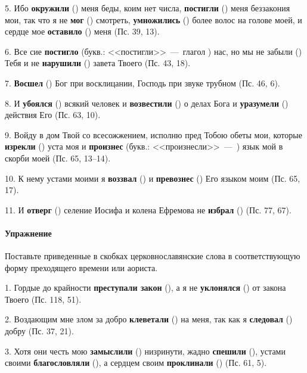 \documentclass[11pt,a4paper,oneside]{memoir}
\begin{document}
    5. Ибо \textbf{окружили} ({}) меня беды, коим нет числа, \textbf{постигли} ({}) меня беззакония мои, так что я не \textbf{мог} ({}) смотреть, \textbf{умножились} ({}) более волос на голове моей, и сердце мое \textbf{оставило} ({}) меня (Пс. 39, 13).
    
    6. Все сие \textbf{постигло} (букв.: <<постигли>>~---~глагол {}) нас, но мы не забыли ({}) Тебя и не \textbf{нарушили} ({}) завета Твоего (Пс. 43, 18).
    
    7. \textbf{Восшел} ({}) Бог при восклицании, Господь при звуке трубном (Пс. 46, 6).
    
    8. И \textbf{убоялся} ({}) всякий человек и \textbf{возвестили} ({}) о делах Бога и \textbf{уразумели} ({}) действия Его (Пс. 63, 10).
    
    9. Войду в дом Твой со всесожжением, исполню пред Тобою обеты мои, которые \textbf{изрекли} ({}) уста моя и \textbf{произнес} (букв.: <<произнесли>>~---~{}) язык мой в скорби моей (Пс. 65, 13--14).
    
    10. К нему устами моими я \textbf{воззвал} ({}) и \textbf{превознес} ({}) Его языком моим (Пс. 65, 17).
    
    11. И \textbf{отверг} ({}) селение Иосифа и колена Ефремова не \textbf{избрал} ({}) (Пс. 77, 67).
    
                    \paragraph{Упражнение}
                    
    Поставьте приведенные в скобках церковнославянские слова в соответствующую форму преходящего времени или аориста.
    
    1. Гордые до крайности \textbf{преступали закон} ({}), а я не \textbf{уклонялся} ({}) от закона Твоего (Пс. 118, 51).
    
    2. Воздающим мне злом за добро \textbf{клеветали} ({}) на меня, так как я \textbf{следовал} ({}) добру (Пс. 37, 21).
    
    3. Хотя они честь мою \textbf{замыслили} ({}) низринути, жадно \textbf{спешили} ({}), устами своими \textbf{благословляли} ({}), а сердцем своим \textbf{проклинали} ({}) (Пс. 61, 5).
    
\end{document}
